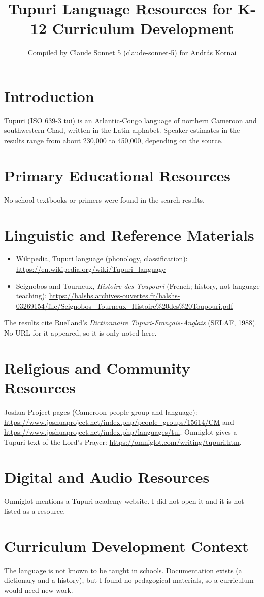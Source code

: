 \documentclass[12pt]{article}
\title{Tupuri Language Resources for K-12 Curriculum Development}
\author{Compiled by Claude Sonnet 5 (claude-sonnet-5) for Andr\'as Kornai}
\date{}
\begin{document}
\maketitle
\section{Introduction}
Tupuri (ISO 639-3 tui) is an Atlantic-Congo language of northern Cameroon and southwestern Chad, written in the Latin alphabet. Speaker estimates in the results range from about 230,000 to 450,000, depending on the source.
\section{Primary Educational Resources}
No school textbooks or primers were found in the search results.
\section{Linguistic and Reference Materials}
\begin{itemize}
\item Wikipedia, Tupuri language (phonology, classification): \url{https://en.wikipedia.org/wiki/Tupuri_language}
\item Seignobos and Tourneux, \emph{Histoire des Toupouri} (French; history, not language teaching): \url{https://halshs.archives-ouvertes.fr/halshs-03269154/file/Seignobos_Tourneux_Histoire%20des%20Toupouri.pdf}
\end{itemize}
The results cite Ruelland's \emph{Dictionnaire Tupuri-Fran\c{c}ais-Anglais} (SELAF, 1988). No URL for it appeared, so it is only noted here.
\section{Religious and Community Resources}
Joshua Project pages (Cameroon people group and language): \url{https://www.joshuaproject.net/index.php/people_groups/15614/CM} and \url{https://www.joshuaproject.net/index.php/languages/tui}. Omniglot gives a Tupuri text of the Lord's Prayer: \url{https://omniglot.com/writing/tupuri.htm}.
\section{Digital and Audio Resources}
Omniglot mentions a Tupuri academy website. I did not open it and it is not listed as a resource.
\section{Curriculum Development Context}
The language is not known to be taught in schools. Documentation exists (a dictionary and a history), but I found no pedagogical materials, so a curriculum would need new work.
\end{document}
